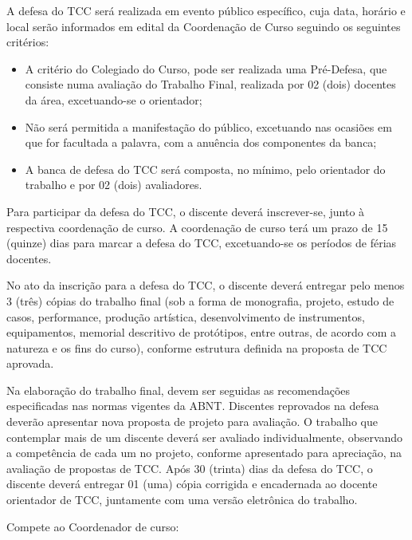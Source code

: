  A defesa do TCC será realizada em evento público específico, cuja data, horário e local serão informados em edital da Coordenação de Curso seguindo os seguintes critérios: 
 
 \begin{itemize}
	\item A critério do Colegiado do Curso, pode ser realizada uma Pré-Defesa, que consiste numa avaliação do Trabalho Final, realizada por 02 (dois) docentes da área, excetuando-se o orientador;

	\item Não será permitida a manifestação do público, excetuando nas ocasiões em que for facultada a palavra, com a anuência dos componentes da banca;

	\item A banca de defesa do TCC será composta, no mínimo, pelo orientador do trabalho e por 02 (dois) avaliadores.
\end{itemize}

	Para participar da defesa do TCC, o discente deverá inscrever-se, junto à respectiva coordenação de curso.  A coordenação de curso terá um prazo de 15 (quinze) dias para marcar a defesa do TCC, excetuando-se os períodos de férias docentes. 
	
	No ato da inscrição para a defesa do TCC, o discente deverá entregar pelo menos 3 (três) cópias do trabalho final (sob a forma de monografia, projeto, estudo de casos, performance, produção artística, desenvolvimento de instrumentos, equipamentos, memorial descritivo de protótipos, entre outras, de acordo com a natureza e os fins do curso), conforme estrutura definida na proposta de TCC aprovada. 
	
	Na elaboração do trabalho final, devem ser seguidas as recomendações especificadas nas normas vigentes da ABNT. Discentes reprovados na defesa deverão apresentar nova proposta de projeto para avaliação. O trabalho que contemplar mais de um discente deverá ser avaliado individualmente, observando a competência de cada um no projeto, conforme apresentado para apreciação, na avaliação de propostas de TCC. Após 30 (trinta) dias da defesa do TCC, o discente deverá entregar 01 (uma) cópia corrigida e encadernada ao docente orientador de TCC, juntamente com uma versão eletrônica do trabalho. 

	Compete ao Coordenador de curso: 

